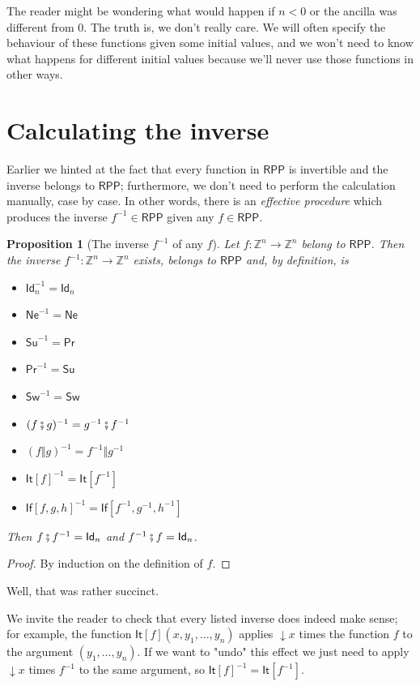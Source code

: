 \documentclass[oneside]{book}
\theoremstyle{definition}
\theoremstyle{remark}
\theoremstyle{plain}
\newtheorem{proposition}{Proposition}
\newcommand{\ZZ}{\mathbb{Z}}
\newcommand{\RPP}{\mathsf{RPP}}
\newcommand{\rppId}{\mathsf{Id}}
\newcommand{\rppNe}{\mathsf{Ne}}
\newcommand{\rppSu}{\mathsf{Su}}
\newcommand{\rppPr}{\mathsf{Pr}}
\newcommand{\rppSw}{\mathsf{Sw}}
\newcommand{\rppCo}{\fatsemi}
\newcommand{\rppPa}{\Vert}
\newcommand{\rppIt}{\mathsf{It}}
\newcommand{\rppIf}{\mathsf{If}}
\begin{document}
The reader might be wondering what would happen if $n < 0$ or the ancilla was different from $0$.
The truth is, we don't really care.
We will often specify the behaviour of these functions given some initial values,
and we won't need to know what happens for different initial values because we'll never use those functions in other ways.

\section{Calculating the inverse}

Earlier we hinted at the fact that every function in $\RPP$ is invertible and the inverse belongs to $\RPP$;
furthermore, we don't need to perform the calculation manually, case by case.
In other words, there is an \textit{effective procedure} which produces the inverse $f^{-1} \in \RPP$ given any $f \in \RPP$.

\begin{proposition}[The inverse $f^{-1}$ of any $f$]
\label{rppinv}
Let $f : \ZZ^n \to \ZZ^n$ belong to $\RPP$.
Then the inverse $f^{-1} : \ZZ^n \to \ZZ^n$ exists, belongs to $\RPP$ and, by definition, is
\begin{itemize}
\item $\rppId_n^{-1} = \rppId_n$
\item $\rppNe^{-1} = \rppNe$
\item $\rppSu^{-1} = \rppPr$
\item $\rppPr^{-1} = \rppSu$
\item $\rppSw^{-1} = \rppSw$
\item $(f \rppCo g)^{-1} = g^{-1} \rppCo f^{-1}$
\item $(f \rppPa g)^{-1} = f^{-1} \rppPa g^{-1}$
\item ${\rppIt[f]}^{-1} = \rppIt[f^{-1}]$
\item ${\rppIf[f, g, h]}^{-1} = \rppIf [f^{-1}, g^{-1}, h^{-1}]$
\end{itemize}
Then $f \rppCo f^{-1} = \rppId_n$ and $f^{-1} \rppCo f = \rppId_n$.
\end{proposition}
\begin{proof}
By induction on the definition of $f$.
\end{proof}

Well, that was rather succinct.

We invite the reader to check that every listed inverse does indeed make sense;
for example, the function $\rppIt[f] (x, y_1, \dots, y_n)$ applies $\downarrow x$ times the function $f$ to the argument $(y_1, \dots, y_n)$.
If we want to "undo" this effect we just need to apply $\downarrow x$ times $f^{-1}$ to the same argument, so
${\rppIt[f]}^{-1} = \rppIt[f^{-1}]$.
\end{document}
